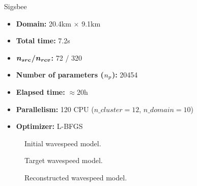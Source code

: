 




\begin{frame}[noframenumbering]{Sigsbee}

  \vspace{-0.6cm}
   \begin{multicols}{2}

     \begin{itemize}
       \scriptsize
    \item \textbf{Domain:} 20.4km $\times$ 9.1km
    \item \textbf{Total time:} 7.2s
    \item \textbf{$\boldsymbol{{n_{src}}}$/$\boldsymbol{{n_{rcv}}}$:} 72 / 320
    \item \textbf{Number of parameters (${n_{p}}$):} 20454
    \item \textbf{Elapsed time:} $\approx$20h
    \item \textbf{Parallelism:} 120 CPU ($n\_cluster=12$, $n\_domain=10$)
    \item \textbf{Optimizer:} L-BFGS
     \end{itemize}

     \columnbreak
     \scriptsize
     \setlength{\modelwidth}{6.0cm}
     \begin{figure}
       \renewcommand{\modelfile}{image/sigsbee_ini}
       
       \vspace{-0.3cm}
       \caption*{\scriptsize{Initial wavespeed model.}}
       \label{marmousi_blind_c4}
     \end{figure}
     \vspace{-1.2cm}
     \begin{figure}
       \renewcommand{\modelfile}{image/sigsbee}
       
       \vspace{-0.3cm}
       \caption*{\scriptsize{Target wavespeed model.}}
       \label{marmousi_blind_c4}
     \end{figure}
     \vspace{-1.2cm}
          \begin{figure}
       \renewcommand{\modelfile}{image/sigsbee_low_freq}
       
       \vspace{-0.3cm}
       \caption*{\scriptsize{Reconstructed wavespeed model.}}
       \label{marmousi_blind_c4}
     \end{figure}


\end{multicols}
\end{frame}
